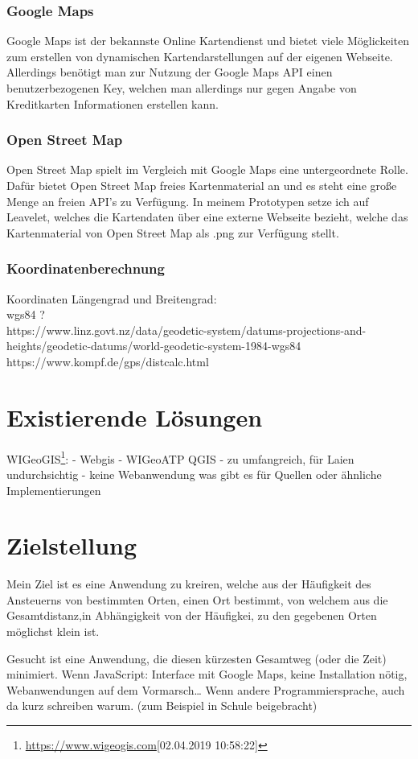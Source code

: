 \documentclass[a4paper, twoside, 12pt]{scrreprt}
\begin{document}
\subsection{Google Maps}
Google Maps ist der bekannste Online Kartendienst und bietet viele Möglickeiten zum erstellen von dynamischen Kartendarstellungen auf der eigenen Webseite.
Allerdings benötigt man zur Nutzung der Google Maps API einen benutzerbezogenen Key, welchen man allerdings nur gegen Angabe von Kreditkarten Informationen erstellen kann.
\subsection{Open Street Map}
Open Street Map spielt im Vergleich mit Google Maps eine untergeordnete Rolle.
Dafür bietet Open Street Map freies Kartenmaterial an und es steht eine große Menge an freien API's zu Verfügung.
In meinem Prototypen setze ich auf Leavelet, welches die Kartendaten über eine externe Webseite bezieht, welche das Kartenmaterial von Open Street Map als .png zur Verfügung stellt.
\subsection{Koordinatenberechnung}
Koordinaten Längengrad und Breitengrad:\\ wgs84 ? \\
https://www.linz.govt.nz/data/geodetic-system/datums-projections-and-heights/geodetic-datums/world-geodetic-system-1984-wgs84 \\
https://www.kompf.de/gps/distcalc.html
\chapter{Existierende Lösungen}
WIGeoGIS\footnote{\url{https://www.wigeogis.com}[02.04.2019 10:58:22]}:
- Webgis
- WIGeoATP
QGIS
- zu umfangreich, für Laien undurchsichtig
- keine Webanwendung
was gibt es für Quellen oder ähnliche Implementierungen
\chapter{Zielstellung}
Mein Ziel ist es eine Anwendung zu kreiren, welche aus der Häufigkeit des Ansteuerns von bestimmten Orten, einen Ort bestimmt, von welchem aus die Gesamtdistanz,in Abhängigkeit von der Häufigkei, zu den gegebenen Orten möglichst klein ist.

Gesucht ist eine Anwendung, die diesen kürzesten Gesamtweg (oder die Zeit) minimiert.
Wenn JavaScript: Interface mit Google Maps, keine Installation nötig, Webanwendungen auf dem Vormarsch…
Wenn andere Programmiersprache, auch da kurz schreiben warum.
(zum Beispiel in Schule beigebracht)
\end{document}
